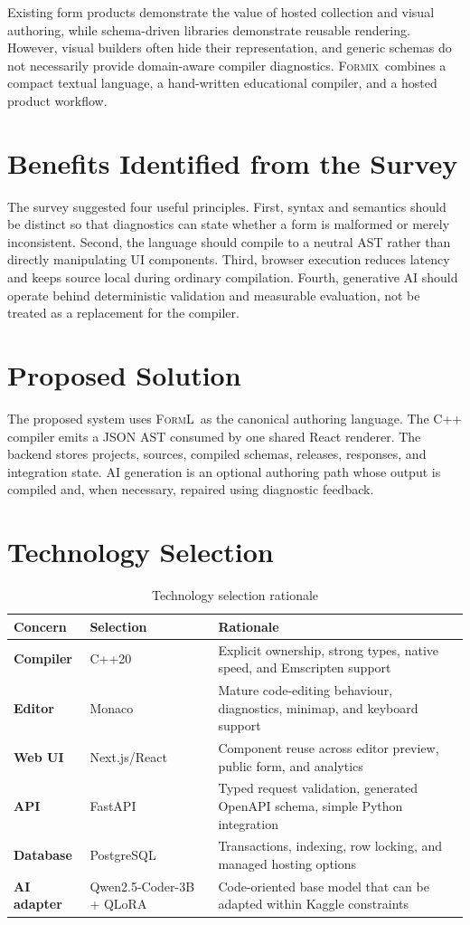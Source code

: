 \documentclass[12pt,a4paper,oneside]{report}
\newcommand{\formix}{\textsc{Formix}}
\newcommand{\forml}{\textsc{FormL}}
\begin{document}
Existing form products demonstrate the value of hosted collection and visual authoring, while
schema-driven libraries demonstrate reusable rendering. However, visual builders often hide
their representation, and generic schemas do not necessarily provide domain-aware compiler
diagnostics. \formix\ combines a compact textual language, a hand-written educational compiler,
and a hosted product workflow.

\section{Benefits Identified from the Survey}
The survey suggested four useful principles. First, syntax and semantics should be distinct so
that diagnostics can state whether a form is malformed or merely inconsistent. Second, the
language should compile to a neutral AST rather than directly manipulating UI components.
Third, browser execution reduces latency and keeps source local during ordinary compilation.
Fourth, generative AI should operate behind deterministic validation and measurable evaluation,
not be treated as a replacement for the compiler.

\section{Proposed Solution}
The proposed system uses \forml\ as the canonical authoring language. The C++ compiler emits a
JSON AST consumed by one shared React renderer. The backend stores projects, sources, compiled
schemas, releases, responses, and integration state. AI generation is an optional authoring
path whose output is compiled and, when necessary, repaired using diagnostic feedback.

\section{Technology Selection}
\begin{table}[H]
\centering
\caption{Technology selection rationale}
\label{tab:tech-selection}
\begin{tabularx}{\textwidth}{>{\bfseries}p{}p{}X}
\toprule
Concern & Selection & Rationale\\
\midrule
Compiler & C++20 & Explicit ownership, strong types, native speed, and Emscripten support\\
Editor & Monaco & Mature code-editing behaviour, diagnostics, minimap, and keyboard support\\
Web UI & Next.js/React & Component reuse across editor preview, public form, and analytics\\
API & FastAPI & Typed request validation, generated OpenAPI schema, simple Python integration\\
Database & PostgreSQL & Transactions, indexing, row locking, and managed hosting options\\
AI adapter & Qwen2.5-Coder-3B + QLoRA & Code-oriented base model that can be adapted within Kaggle constraints\\
\bottomrule
\end{tabularx}
\end{table}
\end{document}

